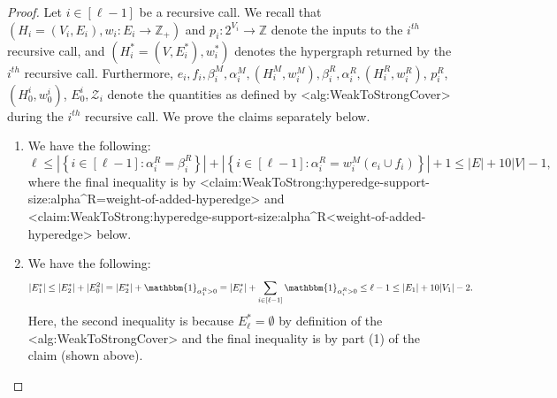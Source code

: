 \documentclass{article}
\def\Cref#1{<#1>}%
\newcommand{\zeros}{\ensuremath{\mathcal{Z}}\xspace}
\newcommand{\indicator}{\ensuremath{\mathbbm{1}}\xspace}
\newcommand{\shubhang}[1]{{\color{blue}[{\tiny Shubhang: \bf #1}]\marginpar{\color{blue}*}}}
\providecommand{\Z}{\mathbb{Z}}
\begin{document}
\begin{proof}
Let $i \in [\ell - 1]$ be a recursive call. We recall that $(H_i = (V_i, E_i), w_i:E_i \rightarrow \Z_+)$ and $p_i : 2^{V_i} \rightarrow \Z$ denote the inputs to the $i^{th}$ recursive call, and $(H_i^* = (V, E_i^*), w_i^*)$ denotes the hypergraph returned by the $i^{th}$ recursive call. Furthermore, $e_i, f_i, \beta_i^M, \alpha_i^M, (H_i^M, w_i^M), \beta_i^R, \alpha_i^R, (H_i^R, w_i^R)$, $p_i^R$, $(H_0^{i}, w_0^{i})$, $E_0^i, \zeros_i$ denote the quantities  as defined by \Cref{alg:WeakToStrongCover} during the $i^{th}$ recursive call.
    We prove the claims separately below.
    \begin{enumerate}
        \item We have the following:
        $$\ell \leq \left|\left\{i \in [\ell - 1] : \alpha_i^R = \beta_i^R\right\}\right|  +  \left|\left\{i \in [\ell- 1] : \alpha_i^R = w_i^M(e_i \cup f_i)\right\}\right| + 1 \leq |E| + 10|V| - 1,$$
        where the final inequality is by \Cref{claim:WeakToStrong:hyperedge-support-size:alpha^R=weight-of-added-hyperedge} and \Cref{claim:WeakToStrong:hyperedge-support-size:alpha^R<weight-of-added-hyperedge} below.
        \item 
        We have the following:
        $$|E_1^*| \leq |E_2^*| + |E_0^2| =   |E_{2}^*| + \indicator_{\alpha_1^R > 0} = |E_{\ell}^*| + \sum_{i \in [\ell - 1]}\indicator_{\alpha_i^R > 0} \leq \ell - 1\leq |E_1| + 10|V_1| - 2.$$
        Here, the second inequality is because $E_{\ell}^* = \emptyset$ by definition of the \Cref{alg:WeakToStrongCover} and the final inequality is by part (1) of the claim (shown above).
    \end{enumerate}
\end{proof}
\end{document}
